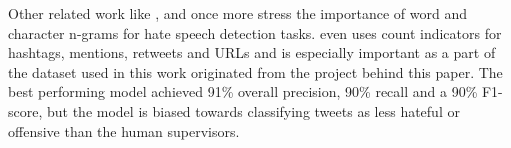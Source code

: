 Other related work like \cite{Gaydhani2018}, \cite{Malmasi2017} and \cite{ThomasDavidson2020} once more stress the importance of word and character n-grams for hate speech detection tasks. \cite{ThomasDavidson2020} even uses count indicators for hashtags, mentions, retweets and URLs and is especially important as a part of the dataset used in this work originated from the project behind this paper. The best performing model achieved 91\% overall precision, 90\% recall and a 90\% F1-score, but the model is biased towards classifying tweets as less hateful or offensive than the human supervisors. 
